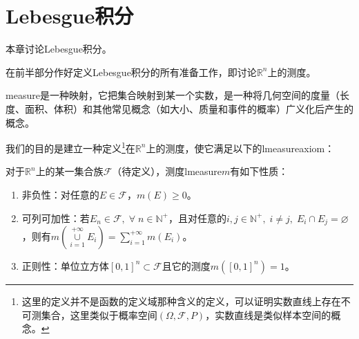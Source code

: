 \chapter{Lebesgue积分}
本章讨论Lebesgue积分。\par
在前半部分作好定义Lebesgue积分的所有准备工作，即讨论$\mathbb{R}^n$上的测度。\par
\gls{measure}是一种映射，它把集合映射到某一个实数，是一种将几何空间的度量（长度、面积、体积）和其他常见概念（如大小、质量和事件的概率）广义化后产生的概念。\par
我们的目的是建立一种定义\footnote{这里的定义并不是函数的定义域那种含义的定义，可以证明实数直线上存在不可测集合，这里类似于概率空间$(\Omega,\mathcal{F},P)$，实数直线是类似样本空间的概念。}在$\mathbb{R}^n$上的测度，使它满足以下的\gls{lmeasureaxiom}：
\begin{axiom}\label{axi:Lebesguem}
	对于$\mathbb{R}^n$上的某一集合族$\mathcal{F}$（待定义\label{sec:lebesgue可测集合族}），测度\gls{lmeasure}$m$有如下性质：
	\begin{enumerate}
		\item 非负性：对任意的$ E\in\mathcal{F}$，$m(E)\geqslant0$。
		\item 可列可加性：若$E_n\in\mathcal{F},\;\forall\;n\in\mathbb{N}^+$，且对任意的$i,j\in\mathbb{N}^+,\;i\ne j,\;E_i\cap E_j=\varnothing$，则有$m(\underset{i=1}{\overset{+\infty}{\cup}} E_i)=\sum\limits_{i=1}^{+\infty}m(E_i)$。
		\item 正则性：单位立方体$[0,1]^n\subset\mathcal{F}$且它的测度$m([0,1]^n)=1$。
	\end{enumerate}
\end{axiom}





